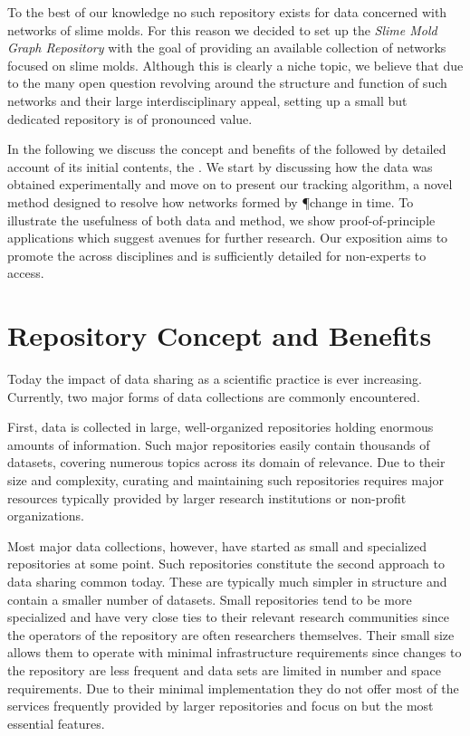 	To the best of our knowledge no such repository exists for data concerned with networks of slime molds. For this reason we decided to set up the \emph{Slime Mold Graph Repository} with the goal of providing an available collection of networks focused on slime molds. Although this is clearly a niche topic, we believe that due to the many open question revolving around the structure and function of such networks and their large interdisciplinary appeal, setting up a small but dedicated repository is of pronounced value.

	In the following we discuss the concept and benefits of the \SMGR followed by detailed account of its initial contents, the \data. We start by discussing how the data was obtained experimentally and move on to present our tracking algorithm, a novel method designed to resolve how networks formed by \P change in time. To illustrate the usefulness of both data and method, we show proof-of-principle applications which suggest avenues for further research. Our exposition aims to promote the \SMGR across disciplines and is sufficiently detailed for non-experts to access.
	
\section{Repository Concept and Benefits}
	
	Today the impact of data sharing as a scientific practice is ever increasing. Currently, two major forms of data collections are commonly encountered.

	First, data is collected in large, well-organized repositories holding enormous amounts of information. Such major repositories easily contain thousands of datasets, covering numerous topics across its domain of relevance. Due to their size and complexity, curating and maintaining such repositories requires major resources typically provided by larger research institutions or non-profit organizations. 

	Most major data collections, however, have started as small and specialized repositories at some point. Such repositories constitute the second approach to data sharing common today. These are typically much simpler in structure and contain a smaller number of datasets. Small repositories tend to be more specialized and have very close ties to their relevant research communities since the operators of the repository are often researchers themselves. Their small size allows them to operate with minimal infrastructure requirements since changes to the repository are less frequent and data sets are limited in number and space requirements. Due to their minimal implementation they do not offer most of the services frequently provided by larger repositories and focus on but the most essential features.

